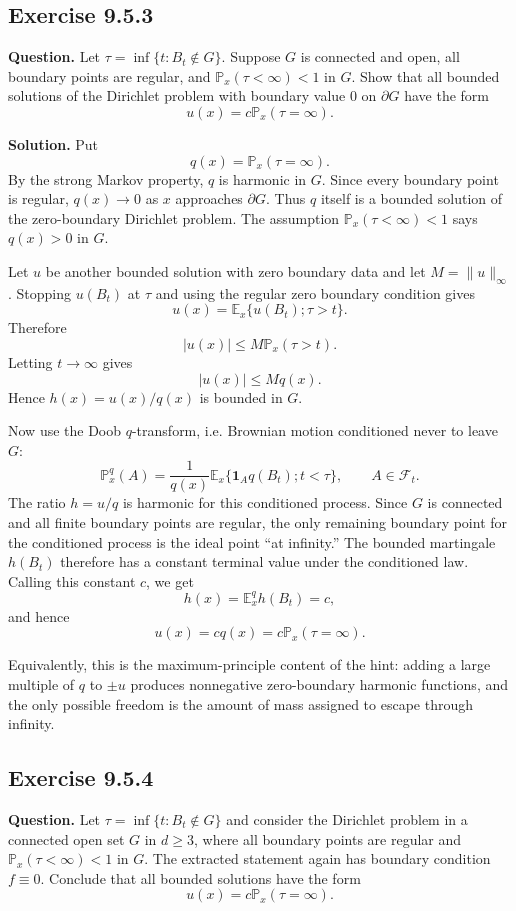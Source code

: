 \documentclass[11pt]{article}
\newcommand{\Prob}{\mathbb{P}}
\newcommand{\E}{\mathbb{E}}
\begin{document}
\subsection*{Exercise 9.5.3}

\noindent\textbf{Question.}
Let $\tau=\inf\{t:B_t\notin G\}$.  Suppose $G$ is connected and open,
all boundary points are regular, and $\Prob_x(\tau<\infty)<1$ in $G$.
Show that all bounded solutions of the Dirichlet problem with boundary
value $0$ on $\partial G$ have the form
\[
  u(x)=c\Prob_x(\tau=\infty).
\]

\noindent\textbf{Solution.}
Put
\[
  q(x)=\Prob_x(\tau=\infty).
\]
By the strong Markov property, $q$ is harmonic in $G$.  Since every
boundary point is regular, $q(x)\to0$ as $x$ approaches $\partial G$.
Thus $q$ itself is a bounded solution of the zero-boundary Dirichlet
problem.  The assumption $\Prob_x(\tau<\infty)<1$ says $q(x)>0$ in $G$.

Let $u$ be another bounded solution with zero boundary data and let
$M=\|u\|_\infty$.  Stopping $u(B_t)$ at $\tau$ and using the regular
zero boundary condition gives
\[
  u(x)=\E_x\{u(B_t);\tau>t\}.
\]
Therefore
\[
  |u(x)|\le M\Prob_x(\tau>t).
\]
Letting $t\to\infty$ gives
\[
  |u(x)|\le Mq(x).
\]
Hence $h(x)=u(x)/q(x)$ is bounded in $G$.

Now use the Doob $q$-transform, i.e. Brownian motion conditioned never
to leave $G$:
\[
  \Prob_x^q(A)
  =
  \frac{1}{q(x)}
  \E_x\{\mathbf{1}_A q(B_t);t<\tau\},
  \qquad A\in\mathcal{F}_t.
\]
The ratio $h=u/q$ is harmonic for this conditioned process.  Since $G$
is connected and all finite boundary points are regular, the only
remaining boundary point for the conditioned process is the ideal point
``at infinity.''  The bounded martingale $h(B_t)$ therefore has a
constant terminal value under the conditioned law.  Calling this
constant $c$, we get
\[
  h(x)=\E_x^q h(B_t)=c,
\]
and hence
\[
  u(x)=cq(x)=c\Prob_x(\tau=\infty).
\]

Equivalently, this is the maximum-principle content of the hint:
adding a large multiple of $q$ to $\pm u$ produces nonnegative
zero-boundary harmonic functions, and the only possible freedom is the
amount of mass assigned to escape through infinity.

\subsection*{Exercise 9.5.4}

\noindent\textbf{Question.}
Let $\tau=\inf\{t:B_t\notin G\}$ and consider the Dirichlet problem in
a connected open set $G$ in $d\ge3$, where all boundary points are
regular and $\Prob_x(\tau<\infty)<1$ in $G$.  The extracted statement
again has boundary condition $f\equiv0$.  Conclude that all bounded
solutions have the form
\[
  u(x)=c\Prob_x(\tau=\infty).
\]
\end{document}
